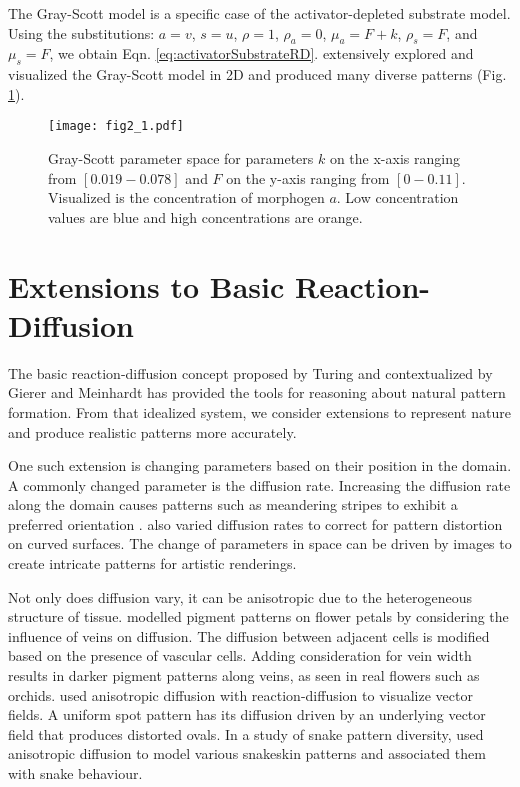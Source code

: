 The Gray-Scott model is a specific case of the activator-depleted substrate model. Using the substitutions: $a = v$, $s = u$, $\rho = 1$, $\rho_a = 0$, $\mu_a = F+k$, $\rho_s = F$, and $\mu_s = F$, we obtain Eqn. \ref{eq:activatorSubstrateRD}. \citet{pearson1993} extensively explored and visualized the Gray-Scott model in 2D and produced many diverse patterns (Fig. \ref{fig:grayscottParameterMap}). 

\begin{figure}[H]
	\centering
	\texttt{[image: fig2\_1.pdf]}
	\caption[Image of the Gray-Scott parameter space]{Gray-Scott parameter space for parameters $k$ on the x-axis ranging from $[0.019 - 0.078]$ and $F$ on the y-axis ranging from $[0 - 0.11]$. Visualized is the concentration of morphogen $a$. Low concentration values are blue and high concentrations are orange.}
	\label{fig:grayscottParameterMap}
\end{figure}

\section{Extensions to Basic Reaction-Diffusion}
The basic reaction-diffusion concept proposed by Turing and contextualized by Gierer and Meinhardt has provided the tools for reasoning about natural pattern formation. From that idealized system, we consider extensions to represent nature and produce realistic patterns more accurately.

One such extension is changing parameters based on their position in the domain. A commonly changed parameter is the diffusion rate. Increasing the diffusion rate along the domain causes patterns such as meandering stripes to exhibit a preferred orientation \citep{zheng2009}. \citet{witkin1991} also varied diffusion rates to correct for pattern distortion on curved surfaces. The change of parameters in space can be driven by images to create intricate patterns for artistic renderings. 

Not only does diffusion vary, it can be anisotropic due to the heterogeneous structure of tissue. \citet{zhou2007} modelled pigment patterns on flower petals by considering the influence of veins on diffusion. The diffusion between adjacent cells is modified based on the presence of vascular cells. Adding consideration for vein width results in darker pigment patterns along veins, as seen in real flowers such as orchids. \citet{sanderson2004} used anisotropic diffusion with reaction-diffusion to visualize vector fields. A uniform spot pattern has its diffusion driven by an underlying vector field that produces distorted ovals. In a study of snake pattern diversity, \citet{allen2013} used anisotropic diffusion to model various snakeskin patterns and associated them with snake behaviour.

